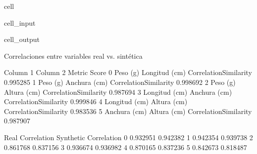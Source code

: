 \documentclass[a4paper,10pt,spanish]{jupyterBook}
\begin{document}
\begin{sphinxuseclass}{cell}\begin{sphinxVerbatimInput}

\begin{sphinxuseclass}{cell_input}
\begin{sphinxVerbatim}[commandchars=\\\{\}]
\end{sphinxVerbatim}

\end{sphinxuseclass}\end{sphinxVerbatimInput}
\begin{sphinxVerbatimOutput}

\begin{sphinxuseclass}{cell_output}
\begin{sphinxVerbatim}[commandchars=\\\{\}]
 Correlaciones entre variables real vs. sintética

        Column 1       Column 2                 Metric     Score  \PYGZbs{}
0       Peso (g)  Longitud (cm)  CorrelationSimilarity  0.995285
1       Peso (g)   Anchura (cm)  CorrelationSimilarity  0.998692
2       Peso (g)    Altura (cm)  CorrelationSimilarity  0.987694
3  Longitud (cm)   Anchura (cm)  CorrelationSimilarity  0.999846
4  Longitud (cm)    Altura (cm)  CorrelationSimilarity  0.983536
5   Anchura (cm)    Altura (cm)  CorrelationSimilarity  0.987907

   Real Correlation  Synthetic Correlation
0          0.932951               0.942382
1          0.942354               0.939738
2          0.861768               0.837156
3          0.936674               0.936982
4          0.870165               0.837236
5          0.842673               0.818487
\end{sphinxVerbatim}

\end{sphinxuseclass}\end{sphinxVerbatimOutput}

\end{sphinxuseclass}
\sphinxstepscope
\end{document}
